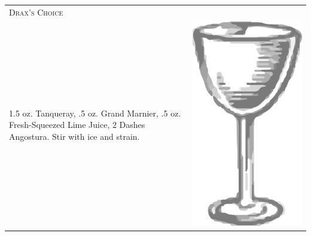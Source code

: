 \documentclass{article}
\begin{document}
\begin{multicols}{2}
\begin{tabular}{p{2in} p{0.5in}}
\multicolumn{2}{p{3in}}{\centering\Huge\textsc{Drax's Choice}}\\ 
  \vspace{-0.1in}1.5 oz. Tanqueray, .5 oz. Grand Marnier, .5 oz. Fresh-Squeezed Lime Juice, 2 Dashes Angostura. Stir with ice and strain. &
  \vspace{-0.1in} \includegraphics{nick_and_nora.png}
\end{tabular}


\end{multicols}
\end{document}
